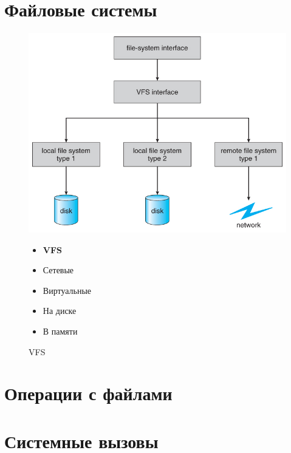 \documentclass[../../lectures.tex]{subfiles}
\begin{document}
\section{Файловые системы}
\begin{figure}[H]
\begin{minipage}[c]{0.6\linewidth}
\centering
\includegraphics[width=\textwidth]{images/virtual-fs.jpg}
\caption{VFS}
\end{minipage}
\begin{minipage}[c]{0.4\linewidth}
\begin{itemize}
    \item \textbf{VFS}
    \item Сетевые
    \item Виртуальные
    \item На диске
    \item В памяти
\end{itemize}
\end{minipage}
\end{figure}

\section{Операции с файлами}

\section{Системные вызовы}
\end{document}
